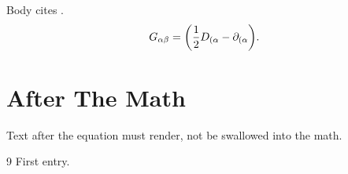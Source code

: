 \documentclass{article}
\begin{document}
Body cites \cite{a}.
\begin{equation}
G_{\alpha\beta}=\qty(\frac{1}{2}D_{(\alpha}-\partial_{(\alpha}) .
\end{equation}
\section{After The Math}
Text after the equation must render, not be swallowed into the math.
\begin{thebibliography}{9}
 First entry.
\end{thebibliography}
\end{document}
